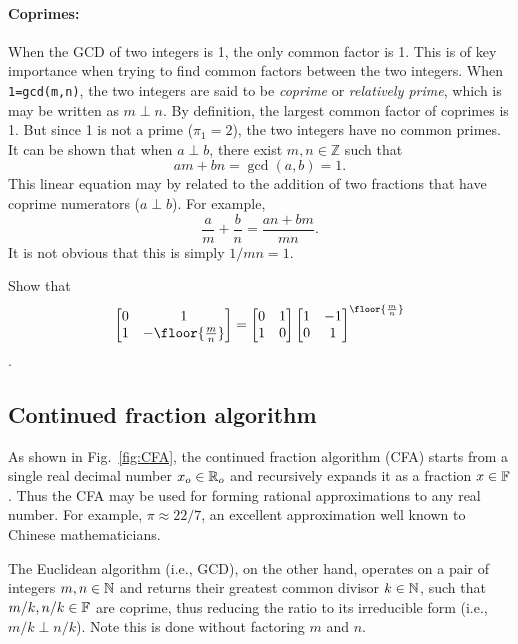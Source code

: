 \documentclass{ximera}
\begin{document}
\paragraph{Coprimes:} When the GCD of two integers is 1, the only common factor is 1. This is of key
importance when trying to find common factors between the two integers.  When \texttt{1=gcd(m,n)}, the two integers are said
to be \emph{coprime} or \emph{relatively prime}, which is may be written as $m \perp n$.  By definition,
the largest common factor of coprimes is 1. But since 1 is not a prime ($\pi_1=2$), the two integers have no
common primes.
It can be shown \citep[pp.~41--4]{JS10} that when $a\perp b$, there exist $m,n\in \mathbb Z$ such that
\[
am+bn = \gcd(a,b)=1.
\]
This linear equation may by related to the addition of two fractions that have coprime numerators ($a\perp b$).
For example,
\[
\frac{a}{m} + \frac{b}{n} = \frac{an + bm}{mn}.
\]
It is not obvious that this is simply $1/mn=1$.


\BEx
Show that
\[
\bbm
0 & 1 \\ 1 & -\floor{ \frac{m}{n} } \\
\ebm
= 
\bbm
0 & 1 \\ 1 & 0 \\
\ebm
\bbm
1 & -1 \\
0 &1 
\ebm
^{ \floor{ \frac{m}{n} } }
\].

\EEx


\subsection {Continued fraction algorithm \label{Lec 6}}

As shown in Fig.~\ref{fig:CFA}, the continued fraction algorithm (CFA) starts from a single real
decimal number $x_o\in\mathbb{R}_o$ and recursively expands it as a fraction $x\in\mathbb{F}$ \citep{GrahamEtAl94}.
Thus the CFA may be used for forming rational approximations to any real number. For example,
$\pi \approx 22/7$, an excellent approximation well known to Chinese mathematicians.
  

The Euclidean algorithm (i.e., GCD), on the other hand, operates on a pair of integers $m,n\in\mathbb{N}$ and
returns their greatest common divisor $k \in \mathbb{N}$, such that $m/k, n/k \in \mathbb{F}$ are coprime, thus reducing the
ratio to its irreducible form (i.e., $m/k \perp n/k$). Note this is done without factoring $m$ and $n$.
\end{document}
